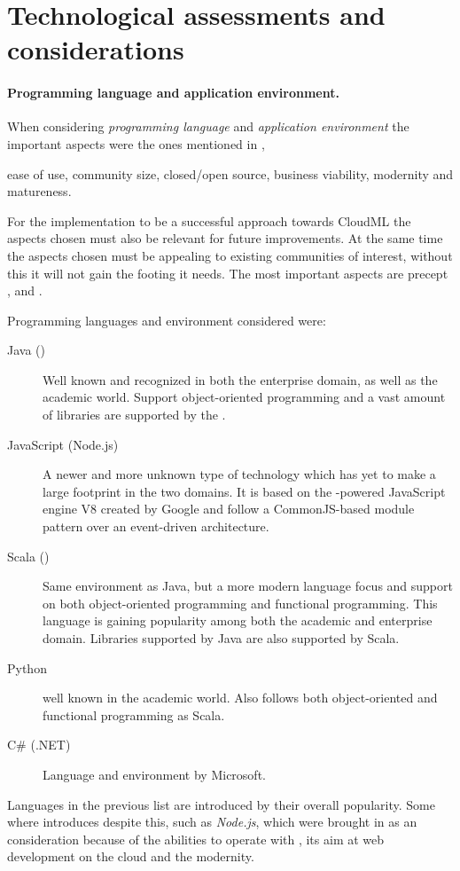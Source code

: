 \section{Technological assessments and considerations}



\paragraph{Programming language and application environment.}

When considering \emph{programming language} and \emph{application environment} 
the important aspects were the ones mentioned in ,
\begin{ii}
  \iitem ease of use,
  \iitem community size,
  \iitem closed/open source,
  \iitem business viability,
  \iitem modernity and 
  \iitem matureness.
\end{ii}
For the implementation to be a successful approach towards CloudML 
the aspects chosen must also be relevant for future improvements.
At the same time the aspects chosen must be appealing to existing communities of interest,
without this it will not gain the footing it needs.
The most important aspects are precept ,  and .

Programming languages and environment considered were:
\begin{description}
  \item[Java ()] Well known and recognized in both the enterprise domain, as well as the academic world.
    Support object-oriented programming and a vast amount of libraries are supported by the .
  \item[JavaScript (Node.js)] A newer and more unknown type of technology which has yet to 
    make a large footprint in the two domains. 
    It is based on the -powered JavaScript engine V8 created by Google and follow a 
    CommonJS-based module pattern over an event-driven architecture.
  \item[Scala ()] Same environment as Java, but a more modern language focus and support on both 
    object-oriented programming and functional programming.
    This language is gaining popularity among both the academic and enterprise domain.
    Libraries supported by Java are also supported by Scala.
  \item[Python] well known in the academic world. Also follows both object-oriented and functional programming as
    Scala.
  \item[C\# (.NET)] Language and environment by Microsoft.
\end{description}
Languages in the previous list are introduced by their overall popularity.
Some where introduces despite this, such as \emph{Node.js}, 
which were brought in as an consideration because of the abilities to operate
with , its aim at web development on the cloud and the modernity.

